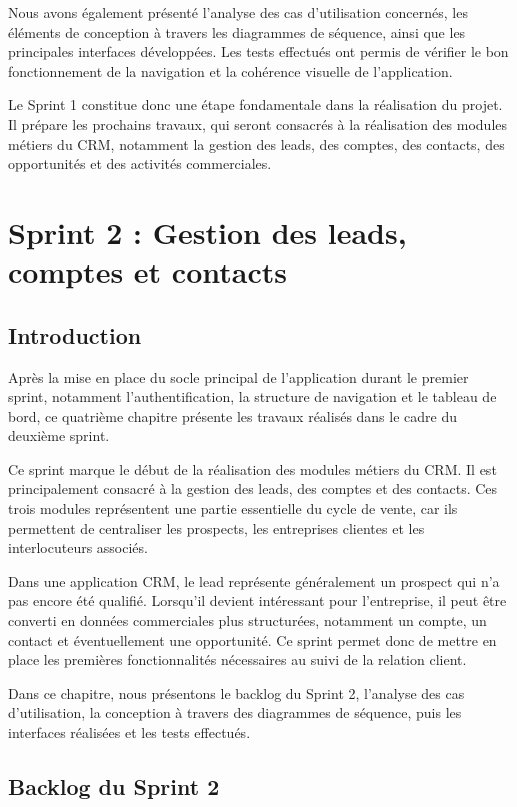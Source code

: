 \documentclass[12pt,a4paper]{report}
\begin{document}
Nous avons également présenté l’analyse des cas d’utilisation concernés, les éléments de conception à travers les diagrammes de séquence, ainsi que les principales interfaces développées. Les tests effectués ont permis de vérifier le bon fonctionnement de la navigation et la cohérence visuelle de l’application.

Le Sprint 1 constitue donc une étape fondamentale dans la réalisation du projet. Il prépare les prochains travaux, qui seront consacrés à la réalisation des modules métiers du CRM, notamment la gestion des leads, des comptes, des contacts, des opportunités et des activités commerciales.

\chapter{Sprint 2 : Gestion des leads, comptes et contacts}

\section*{Introduction}

Après la mise en place du socle principal de l’application durant le premier sprint, notamment l’authentification, la structure de navigation et le tableau de bord, ce quatrième chapitre présente les travaux réalisés dans le cadre du deuxième sprint.

Ce sprint marque le début de la réalisation des modules métiers du CRM. Il est principalement consacré à la gestion des leads, des comptes et des contacts. Ces trois modules représentent une partie essentielle du cycle de vente, car ils permettent de centraliser les prospects, les entreprises clientes et les interlocuteurs associés.

Dans une application CRM, le lead représente généralement un prospect qui n’a pas encore été qualifié. Lorsqu’il devient intéressant pour l’entreprise, il peut être converti en données commerciales plus structurées, notamment un compte, un contact et éventuellement une opportunité. Ce sprint permet donc de mettre en place les premières fonctionnalités nécessaires au suivi de la relation client.

Dans ce chapitre, nous présentons le backlog du Sprint 2, l’analyse des cas d’utilisation, la conception à travers des diagrammes de séquence, puis les interfaces réalisées et les tests effectués.

\section{Backlog du Sprint 2}
\end{document}
